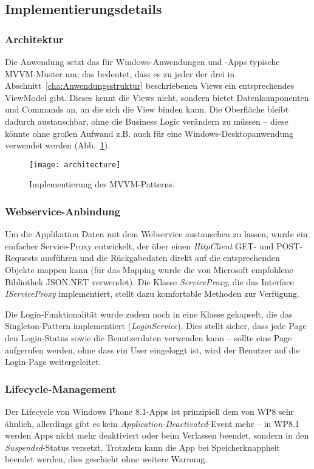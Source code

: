 \documentclass[a4paper,ngerman]{scrartcl}
\begin{document}
\subsection{Implementierungsdetails}
\subsubsection{Architektur}
Die Anwendung setzt das für Windows-Anwendungen und -Apps typische MVVM-Muster um; das bedeutet, dass es zu jeder der drei in Abschnitt~\ref{cha:Anwendungsstruktur} beschriebenen Views ein entsprechendes ViewModel gibt. Dieses kennt die Views nicht, sondern bietet Datenkomponenten und Commands an, an die sich die View binden kann. Die Oberfläche bleibt dadurch austauschbar, ohne die Business Logic verändern zu müssen -- diese könnte ohne großen Aufwand z.B. auch für eine Windows-Desktopanwendung verwendet werden (Abb.~\ref{fig:arch}). 

\begin{figure}[h]
\centering
\texttt{[image: architecture]}
\caption{Implementierung des MVVM-Patterns.}
\label{fig:arch}
\end{figure}

\subsubsection{Webservice-Anbindung}
Um die Applikation Daten mit dem Webservice austauschen zu lassen, wurde ein einfacher Service-Proxy entwickelt, der über einen \textit{HttpClient} GET- und POST-Requests ausführen und die Rückgabedaten direkt auf die entsprechenden Objekte mappen kann (für das Mapping wurde die von Microsoft empfohlene Bibliothek JSON.NET verwendet). Die Klasse \textit{ServiceProxy}, die das Interface \textit{IServiceProxy} implementiert, stellt dazu komfortable Methoden zur Verfügung. 

Die Login-Funktionalität wurde zudem noch in eine Klasse gekapselt, die das Singleton-Pattern implementiert (\textit{LoginService}). Dies stellt sicher, dass jede Page den Login-Status sowie die Benutzerdaten verwenden kann -- sollte eine Page aufgerufen werden, ohne dass ein User eingeloggt ist, wird der Benutzer auf die Login-Page weitergeleitet.

\subsubsection{Lifecycle-Management}
Der Lifecycle von Windows Phone 8.1-Apps ist prinzipiell dem von WP8 sehr ähnlich, allerdings gibt es kein \textit{Application-Deactivated}-Event mehr -- in WP8.1 werden Apps nicht mehr deaktiviert oder beim Verlassen beendet, sondern in den \textit{Suspended}-Status versetzt. Trotzdem kann die App bei Speicherknappheit beendet werden, dies geschieht ohne weitere Warnung.
\end{document}
